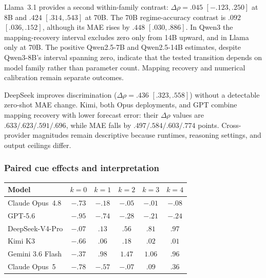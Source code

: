 Llama~3.1 provides a second within-family contrast: $\Delta\rho=.045$
$[-.123,.250]$ at 8B and $.424$ $[.314,.543]$ at 70B. The 70B
regime-accuracy contrast is $.092$ $[.036,.152]$, although its MAE rises by
$.448$ $[.030,.886]$. In Qwen3 the mapping-recovery interval excludes zero only
from 14B upward, and in Llama only at 70B. The positive Qwen2.5-7B and
Qwen2.5-14B estimates, despite Qwen3-8B's interval spanning zero, indicate that
the tested transition depends on model family rather than parameter count. Mapping recovery and numerical calibration remain
separate outcomes.

DeepSeek improves discrimination ($\Delta\rho=.436$ $[.323,.558]$) without a
detectable zero-shot MAE change. Kimi, both Opus deployments, and GPT combine
mapping recovery with lower forecast error: their $\Delta\rho$ values are
$.633/.623/.591/.696$, while MAE falls by $.497/.584/.603/.774$ points.
Cross-provider magnitudes remain descriptive because runtimes, reasoning settings,
and output ceilings differ.

\subsubsection{Paired cue effects and interpretation}

\begin{center}
\begin{minipage}{\linewidth}
\centering
{}
\label{tab:coin-city-vs-ols}
\small
\setlength{\tabcolsep}{5pt}
\begin{tabular}{l ccccc}
\toprule
Model & $k{=}0$ & $k{=}1$ & $k{=}2$ & $k{=}3$ & $k{=}4$ \\
\midrule
Claude Opus~4.8 & \textbf{$-.73$} & $-.18$ & $-.05$ & $-.01$ & $-.08$ \\
GPT-5.6 & \textbf{$-.95$} & \textbf{$-.74$} & \textbf{$-.28$} & $-.21$ & \textbf{$-.24$} \\
DeepSeek-V4-Pro & $-.07$ & $.13$ & \textbf{$.56$} & \textbf{$.81$} & \textbf{$.97$} \\
Kimi K3 & \textbf{$-.66$} & $.06$ & $.18$ & $.02$ & $.01$ \\
Gemini 3.6 Flash & \textbf{$-.37$} & \textbf{$.98$} & \textbf{$1.47$} & \textbf{$1.06$} & \textbf{$.96$} \\
Claude Opus~5 & \textbf{$-.78$} & \textbf{$-.57$} & $-.07$ & $.09$ & \textbf{$.36$} \\
\bottomrule
\end{tabular}
\end{minipage}
\end{center}
\endgroup

